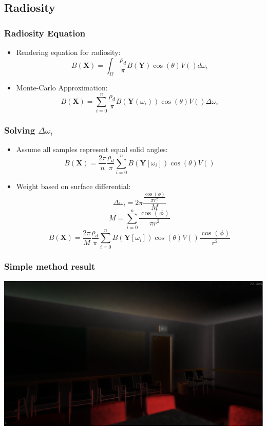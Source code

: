 \documentclass{beamer}
\begin{document}
\subsection{Radiosity}

\begin{frame}
\frametitle{Radiosity Equation}
\begin{itemize}
\item Rendering equation for radiosity:
$$B(\mathbf{X}) = \int_\Omega \frac{\rho_d}{\pi} B(\mathbf{Y}) \cos(\theta) V() d\omega_i$$
\item Monte-Carlo Approximation:
$$B(\mathbf{X}) = \sum_{i=0}^{n} \frac{\rho_d}{\pi} B(\mathbf{Y}(\omega_i)) \cos(\theta) V() \Delta \omega_i$$
\end{itemize}
\end{frame}

\begin{frame}
\frametitle{Solving $\Delta \omega_i$}
\begin{itemize}
\item Assume all samples represent equal solid angles:
$$B(\mathbf{X}) = \frac{2\pi}{n} \frac{\rho_d}{\pi} \sum_{i=0}^{n} B(\mathbf{Y}[\omega_i]) \cos(\theta)V()$$
\item Weight based on surface differential:
$$\Delta \omega_i = 2\pi \frac{\frac{\cos(\phi)}{\pi r^2}}{M}$$
$$M = \sum_{i = 0}^{n}\frac{\cos(\phi)}{\pi r^2}$$
$$B(\mathbf{X}) = \frac{2\pi}{M} \frac{\rho_d}{\pi} \sum_{i=0}^{n} B(\mathbf{Y}[\omega_i]) \cos(\theta)V()\frac{\cos(\phi)}{r^2}$$
\end{itemize}
\end{frame}

\begin{frame}
\frametitle{Simple method result}
\begin{center}
\includegraphics[scale=0.3]{img/w-edge-rad}
\end{center}
\end{frame}
\end{document}
